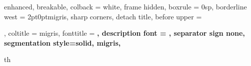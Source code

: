 
{%
    enhanced,
    breakable,
    colback = white,
    frame hidden,
    boxrule = 0sp,
    borderline west = {2pt}{0pt}{migris},
    sharp corners,
    detach title,
    before upper = \tcbtitle\par\smallskip,
    coltitle = migris,
    fonttitle = \bfseries\sffamily,
    description font = \mdseries,
    separator sign none,
    segmentation style={solid, migris},
}
{th}

\newcommand{\teorema}[2]{\begin{Teorema}{#1}{}#2\end{Teorema}}
\newcommand{\corolario}[2]{\begin{Corolario}{#1}{}#2\end{Corolario}}
\newcommand{\lema}[2]{\begin{Lema}{#1}{}#2\end{Lema}}
\newcommand{\preposicion}[2]{\begin{Prepo}{#1}{}#2\end{Prepo}}
\newcommand{\nota}[2]{\begin{Nota}{#1}{}#2\end{Nota}}
\newcommand{\dfe}[2]{\begin{defi}{#1}{}#2\end{defi}}
\newcommand{\demostracion}[1]{\begin{proof}[\color{primary}\textbf{Demostración.}] #1 \end{proof}}

\theoremstyle{definition}
\newtheorem{ejem}{\color{primary}Ejemplo}
\newcommand{\ejemplo}[1]{\begin{ejem}#1\end{ejem}}

\theoremstyle{definition}
\newtheorem{solu}{\color{primary}Solución}
\newcommand{\solucion}[1]{\begin{solu}#1\end{solu}}

\usepackage{tikz}

\usepackage{enumitem}

\newcommand{\cnumero}[2]{
    \tikz[baseline=(myanchor.base)]
    \node[minimum size=0.2cm,circle,
        inner sep=1pt,draw, #2,thick,fill=#2](myanchor)
    {\color{white}\bfseries\fontsize{8}{8}#1};}


